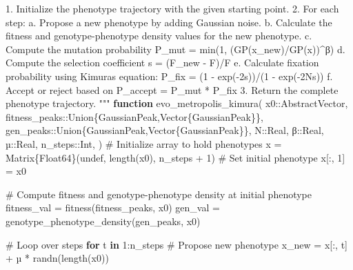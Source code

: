 \documentclass[
]{scrartcl}
\newenvironment{Shaded}{\begin{snugshade}}{\end{snugshade}}
\newcommand{\CommentTok}[1]{\textcolor[rgb]{0.37,0.37,0.37}{#1}}
\newcommand{\ConstantTok}[1]{\textcolor[rgb]{0.56,0.35,0.01}{#1}}
\newcommand{\ControlFlowTok}[1]{\textcolor[rgb]{0.00,0.23,0.31}{\textbf{#1}}}
\newcommand{\DataTypeTok}[1]{\textcolor[rgb]{0.68,0.00,0.00}{#1}}
\newcommand{\FloatTok}[1]{\textcolor[rgb]{0.68,0.00,0.00}{#1}}
\newcommand{\FunctionTok}[1]{\textcolor[rgb]{0.28,0.35,0.67}{#1}}
\newcommand{\KeywordTok}[1]{\textcolor[rgb]{0.00,0.23,0.31}{\textbf{#1}}}
\newcommand{\NormalTok}[1]{\textcolor[rgb]{0.00,0.23,0.31}{#1}}
\newcommand{\OperatorTok}[1]{\textcolor[rgb]{0.37,0.37,0.37}{#1}}
\newcommand{\StringTok}[1]{\textcolor[rgb]{0.13,0.47,0.30}{#1}}
\begin{document}
\begin{Shaded}
\begin{Highlighting}[]
\StringTok{1. Initialize the phenotype trajectory with the given starting point.}
\StringTok{2. For each step: }
\StringTok{   a. Propose a new phenotype by adding Gaussian noise. }
\StringTok{   b. Calculate the fitness and genotype{-}phenotype density values for the new }
\StringTok{      phenotype.}
\StringTok{   c. Compute the mutation probability P\_mut = min(1, (GP(x\_new)/GP(x))\^{}β)}
\StringTok{   d. Compute the selection coefficient s = (F\_new {-} F)/F}
\StringTok{   e. Calculate fixation probability using Kimura\textquotesingle{}s equation:}
\StringTok{      P\_fix = (1 {-} exp({-}2s))/(1 {-} exp({-}2Ns))}
\StringTok{   f. Accept or reject based on P\_accept = P\_mut * P\_fix}
\StringTok{3. Return the complete phenotype trajectory.}
\StringTok{"""}
\KeywordTok{function} \FunctionTok{evo\_metropolis\_kimura}\NormalTok{(}
\NormalTok{    x0}\OperatorTok{::}\DataTypeTok{AbstractVector}\NormalTok{,}
\NormalTok{    fitness\_peaks}\OperatorTok{::}\DataTypeTok{Union\{GaussianPeak,Vector\{GaussianPeak\}\}}\NormalTok{,}
\NormalTok{    gen\_peaks}\OperatorTok{::}\DataTypeTok{Union\{GaussianPeak,Vector\{GaussianPeak\}\}}\NormalTok{,}
\NormalTok{    N}\OperatorTok{::}\DataTypeTok{Real}\NormalTok{,}
\NormalTok{    β}\OperatorTok{::}\DataTypeTok{Real}\NormalTok{,}
\NormalTok{    µ}\OperatorTok{::}\DataTypeTok{Real}\NormalTok{,}
\NormalTok{    n\_steps}\OperatorTok{::}\DataTypeTok{Int}\NormalTok{,}
\NormalTok{)}
    \CommentTok{\# Initialize array to hold phenotypes}
\NormalTok{    x }\OperatorTok{=} \FunctionTok{Matrix}\DataTypeTok{\{Float64\}}\NormalTok{(}\ConstantTok{undef}\NormalTok{, }\FunctionTok{length}\NormalTok{(x0), n\_steps }\OperatorTok{+} \FloatTok{1}\NormalTok{)}
    \CommentTok{\# Set initial phenotype}
\NormalTok{    x[}\OperatorTok{:}\NormalTok{, }\FloatTok{1}\NormalTok{] }\OperatorTok{=}\NormalTok{ x0}

    \CommentTok{\# Compute fitness and genotype{-}phenotype density at initial phenotype}
\NormalTok{    fitness\_val }\OperatorTok{=} \FunctionTok{fitness}\NormalTok{(fitness\_peaks, x0)}
\NormalTok{    gen\_val }\OperatorTok{=} \FunctionTok{genotype\_phenotype\_density}\NormalTok{(gen\_peaks, x0)}

    \CommentTok{\# Loop over steps}
    \ControlFlowTok{for}\NormalTok{ t }\KeywordTok{in} \FloatTok{1}\OperatorTok{:}\NormalTok{n\_steps}
        \CommentTok{\# Propose new phenotype}
\NormalTok{        x\_new }\OperatorTok{=}\NormalTok{ x[}\OperatorTok{:}\NormalTok{, t] }\OperatorTok{+}\NormalTok{ µ }\OperatorTok{*} \FunctionTok{randn}\NormalTok{(}\FunctionTok{length}\NormalTok{(x0))}


\end{Highlighting}
\end{Shaded}
\end{document}
